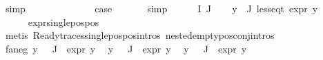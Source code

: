\begin{isabellebody}
\ simp\ \isanewline
{}\isamarkupfalse%
\isanewline
\ \ \isamarkupfalse%
\ {\isacharparenleft}{\kern0pt}{}\ {\isasymphi}\ {\isasymalpha}{\isacharparenright}{\kern0pt}\ \isanewline
\ \ \isamarkupfalse%
\ \isamarkupfalse%
\ {\isacharquery}{\kern0pt}case\ \isanewline
\ \ \ \ \isamarkupfalse%
\ simp\isanewline
{}\isamarkupfalse%
\isanewline
\ \ \isamarkupfalse%
\ {\isacharparenleft}{\kern0pt}{}\ {\isasymPhi}\ I\ J{\isacharparenright}{\kern0pt}\isanewline
\ \ \isamarkupfalse%
\ {\isachardoublequoteopen}{\isasymforall}y{\isasymin}{\isasymPhi}\ {\isacharbackquote}{\kern0pt}\ J{\isachardot}{\kern0pt}\ less{\isacharunderscore}{\kern0pt}eq{\isacharunderscore}{\kern0pt}t\ {\isacharparenleft}{\kern0pt}expr\ y{\isacharparenright}{\kern0pt}\ {\isacharparenleft}{\kern0pt}{}{\isacharcomma}{\kern0pt}\ {\isasyminfinity}{\isacharcomma}{\kern0pt}\ {}{\isacharcomma}{\kern0pt}\ {}{\isacharcomma}{\kern0pt}\ {}{\isacharcomma}{\kern0pt}\ {}{\isacharparenright}{\kern0pt}{\isachardoublequoteclose}\isanewline
\ \ \ \ \isamarkupfalse%
\ expr{\isacharunderscore}{\kern0pt}single{\isacharunderscore}{\kern0pt}pos{\isacharunderscore}{\kern0pt}pos\ \isanewline
\ \ \ \ \isamarkupfalse%
\ {\isacharparenleft}{\kern0pt}metis\ Ready{\isacharunderscore}{\kern0pt}traces{\isachardot}{\kern0pt}single{\isacharunderscore}{\kern0pt}pos{\isacharunderscore}{\kern0pt}pos{\isachardot}{\kern0pt}intros{\isacharparenleft}{\kern0pt}{}{\isacharparenright}{\kern0pt}\ nested{\isacharunderscore}{\kern0pt}empty{\isacharunderscore}{\kern0pt}pos{\isacharunderscore}{\kern0pt}conj{\isachardot}{\kern0pt}intros{\isacharparenleft}{\kern0pt}{}{\isacharparenright}{\kern0pt}{\isacharparenright}{\kern0pt}\isanewline
\ \ \isamarkupfalse%
\ fa{\isacharunderscore}{\kern0pt}neg{\isacharcolon}{\kern0pt}\ {\isachardoublequoteopen}{\isasymforall}y\ {\isasymin}{\isasymPhi}\ {\isacharbackquote}{\kern0pt}\ J{\isachardot}{\kern0pt}\ \ expr{\isacharunderscore}{\kern0pt}{}\ y\ {\isasymle}\ {}{\isachardoublequoteclose}\isanewline
{\isachardoublequoteopen}{\isasymforall}y\ {\isasymin}{\isasymPhi}\ {\isacharbackquote}{\kern0pt}\ J{\isachardot}{\kern0pt}\ \ expr{\isacharunderscore}{\kern0pt}{}\ y\ {\isasymle}\ {}{\isachardoublequoteclose}\isanewline
{\isachardoublequoteopen}{\isasymforall}y\ {\isasymin}{\isasymPhi}\ {\isacharbackquote}{\kern0pt}\ J{\isachardot}{\kern0pt}\ \ expr{\isacharunderscore}{\kern0pt}{}\ y\ {\isasymle}\ {}{\isachardoublequoteclose}\isanewline

\end{isabellebody}
